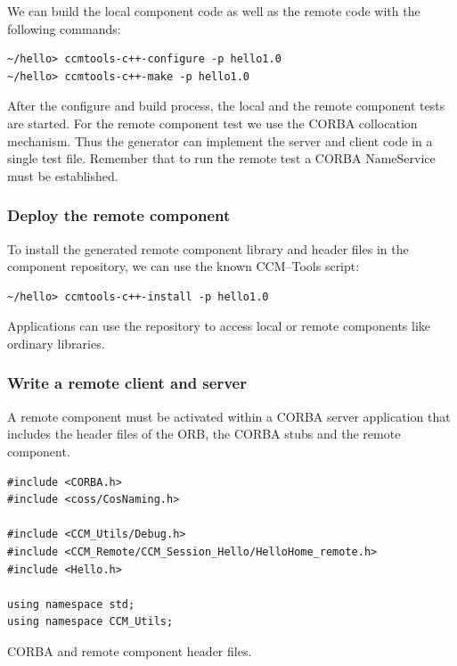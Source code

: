 \noindent
We can build the local component code as well as the remote code with the
following commands:
\begin{small}
\begin{verbatim}
~/hello> ccmtools-c++-configure -p hello1.0
~/hello> ccmtools-c++-make -p hello1.0
\end{verbatim}
\end{small}
After the configure and build process, the local and the remote component tests
are started.
For the remote component test we use the CORBA collocation mechanism. Thus the 
generator  can implement the server and client code in a single test file.
Remember that to run the remote test a CORBA NameService must be established.


\subsubsection{Deploy the remote component}

To install the generated remote component library and header files in the
component repository, we can use the known CCM--Tools script:
\begin{verbatim}
~/hello> ccmtools-c++-install -p hello1.0
\end{verbatim}

\noindent
Applications can use the repository to access local or remote components 
like ordinary libraries.


\subsubsection{Write a remote client and server}

A remote component must be activated within a CORBA server application that
includes the header files of the ORB, the CORBA stubs and the remote
component.
\begin{Example}
\begin{minifbox}
\begin{small}
\begin{verbatim}
#include <CORBA.h>
#include <coss/CosNaming.h>

#include <CCM_Utils/Debug.h>
#include <CCM_Remote/CCM_Session_Hello/HelloHome_remote.h>
#include <Hello.h>

using namespace std;
using namespace CCM_Utils;
\end{verbatim}
\end{small}
\end{minifbox}
\caption{CORBA and remote component header files.}
\label{ServerHeaderFiles}
\end{Example}

